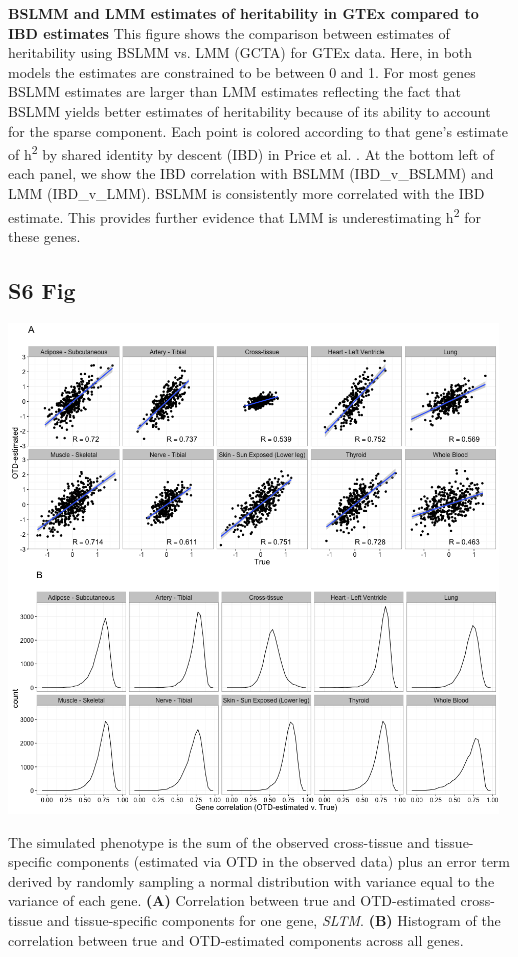 \documentclass[10pt,letterpaper]{article}
\begin{document}
\begin{singlespace}
{\bf BSLMM and LMM estimates of heritability in GTEx compared to IBD estimates} 
This figure shows the comparison between estimates of heritability using BSLMM vs. LMM (GCTA) for GTEx data. Here, in both models the estimates are constrained to be between 0 and 1. For most genes BSLMM estimates are larger than LMM estimates reflecting the fact that BSLMM yields better estimates of heritability because of its ability to account for the sparse component. Each point is colored according to that gene's estimate of h\textsuperscript{2} by shared identity by descent (IBD) in Price et al. \cite{Price_2011}. At the bottom left of each panel, we show the IBD correlation with BSLMM (IBD\_v\_BSLMM) and LMM (IBD\_v\_LMM). BSLMM is consistently more correlated with the IBD estimate. This  provides further evidence that LMM is underestimating h\textsuperscript{2} for these genes.

\subsection*{S6 Fig}
\includegraphics[width=13cm]{Figures/sim_v_obs_SLTM_ALL.png}
\label{S6_Fig}

 The simulated phenotype is the sum of the observed cross-tissue and tissue-specific components (estimated via OTD in the observed data) plus an error term derived by randomly sampling a normal distribution with variance equal to the variance of each gene. {\bf (A)} Correlation between true and OTD-estimated cross-tissue and tissue-specific components for one gene, \textit{SLTM}.  {\bf(B)} Histogram of the correlation between true and OTD-estimated components across all genes.


\end{singlespace}
\end{document}
